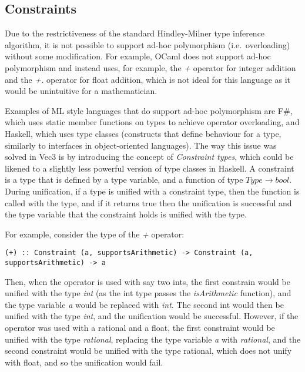 \subsection{Constraints}\label{subsec:constraints}

Due to the restrictiveness of the standard Hindley-Milner type inference algorithm, it is not possible to support ad-hoc
polymorphism (i.e.\ overloading) without some modification.
For example, OCaml\citep{ocamlDocs} does not support ad-hoc polymorphism and instead uses, for example, the \textit{+}
operator for integer addition and the \textit{+.} operator for float addition, which is not ideal for this language 
as it would be unintuitive for a mathematician.

Examples of ML style languages that do support ad-hoc polymorphism are F\#, which uses static member functions on 
types to achieve operator overloading\citep{fsharpdocs}, and Haskell, which uses type classes\citep{haskellDocs} (constructs that define behaviour for a type, similarly to interfaces in object-oriented languages).
The way this issue was solved in Vec3 is by introducing the concept of \textit{Constraint types}, which could be 
likened to a slightly less powerful version of type classes in Haskell.
A constraint is a type that is defined by a type variable, and a function of type \textit{$Type \rightarrow bool$}.
During unification, if a type is unified with a constraint type, then the function is called with the type, and if it
returns true then the unification is successful and the type variable that the constraint holds is unified with the
type.

For example, consider the type of the \textit{+} operator:

\begin{verbatim}
(+) :: Constraint (a, supportsArithmetic) -> Constraint (a, supportsArithmetic) -> a
\end{verbatim}

Then, when the operator is used with say two ints, the first constrain would be unified with the type 
\textit{int} (as the int type passes the \textit{isArithmetic} function), and the type variable \textit{a} would be 
replaced with \textit{int}.
The second int would then be unified with the type \textit{int}, and the unification would be successful.
However, if the operator was used with a rational and a float, the first constraint would be unified with the type
\textit{rational}, replacing the type variable \textit{a} with \textit{rational}, and the second constraint would be 
unified with the type rational, which does not unify with float, and so the unification would fail.

